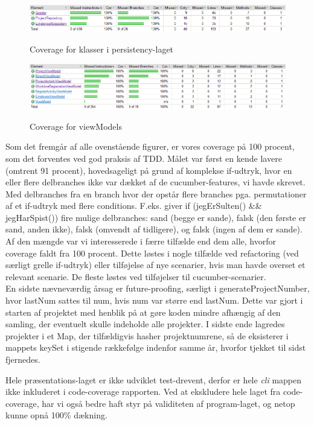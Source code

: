 \begin{figure}[H]
    \centering
    \caption{Coverage for klasser i persistency-laget}
    \includegraphics[width = 12cm, keepaspectratio]{ImplementationAndTest/Diagrams/coverage/coverage_persistency.png}
    \label{fig:coverage_persistency}
\end{figure}
\begin{figure}[H]
    \centering
    \caption{Coverage for viewModels}
    \includegraphics[width = 12cm, keepaspectratio]{ImplementationAndTest/Diagrams/coverage/coverage_viewModels.png}
    \label{fig:coverage_viewModels}
\end{figure}
Som det fremgår af alle ovenstående figurer, er vores coverage på 100 procent, som det forventes ved god praksis af TDD. Målet var først en kende lavere (omtrent 91 procent), hovedsageligt på grund af komplekse if-udtryk, hvor en eller flere delbranches ikke var dækket af de cucumber-features, vi havde skrevet. Med delbranches fra en branch hvor der opstår flere branches pga. permutationer af et if-udtryk med flere conditions. F.eks. giver if (jegErSulten() \&\& jegHarSpist()) fire mulige delbranches: sand (begge er sande), falsk (den første er sand, anden ikke), falsk (omvendt af tidligere), og falsk (ingen af dem er sande). Af den mængde var vi interesserede i færre tilfælde end dem alle, hvorfor coverage faldt fra 100 procent. Dette løstes i nogle tilfælde ved refactoring (ved særligt grelle if-udtryk) eller tilføjelse af nye scenarier, hvis man havde overset et relevant scenarie. De fleste løstes ved tilføjelser til cucumber-scenarier.\\[4mm] En sidste nævneværdig årsag er future-proofing, særligt i generateProjectNumber, hvor lastNum sattes til num, hvis num var større end lastNum. Dette var gjort i starten af projektet med henblik på at gøre koden mindre afhængig af den samling, der eventuelt skulle indeholde alle projekter. I sidste ende lagredes projekter i et Map, der tilfældigvis hasher projektnumrene, så de eksisterer i mappets keySet i stigende rækkefølge indenfor samme år, hvorfor tjekket til sidst fjernedes. 

Hele præsentations-laget er ikke udviklet test-drevent, derfor er hele \textit{cli} mappen ikke inkluderet i code-coverage rapporten. Ved at ekskludere hele laget fra code-coverage, har vi også bedre haft styr på validiteten af program-laget, og netop kunne opnå 100\% dækning.